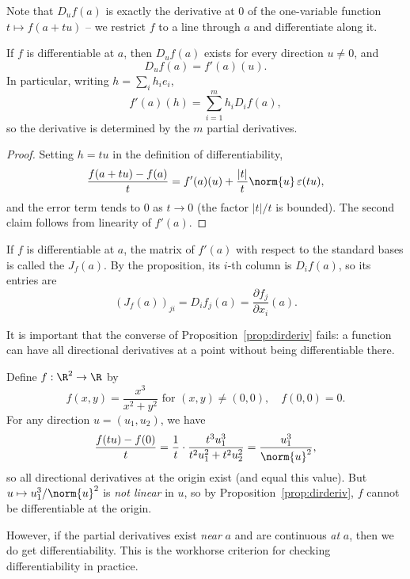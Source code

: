 Note that $D_u f(a)$ is exactly the derivative at $0$ of the one-variable function $t \mapsto f(a + tu)$ -- we restrict $f$ to a line through $a$ and differentiate along it.

\begin{proposition}\label{prop:dirderiv}
    If $f$ is differentiable at $a$, then $D_u f(a)$ exists for every direction $u \neq 0$, and
    $$
    D_u f(a) = f'(a)(u).
    $$
    In particular, writing $h = \sum_i h_i e_i$,
    $$
    f'(a)(h) = \sum_{i = 1}^m h_i D_i f(a),
    $$
    so the derivative is determined by the $m$ partial derivatives.
\end{proposition}
\begin{proof}
    Setting $h = tu$ in the definition of differentiability,
    $$
    \frac{f(a + tu) - f(a)}{t} = f'(a)(u) + \frac{|t|}{t}\norm{u} \, \varepsilon(tu),
    $$
    and the error term tends to $0$ as $t \rightarrow 0$ (the factor $|t|/t$ is bounded). The second claim follows from linearity of $f'(a)$.
\end{proof}

\begin{definition}
    If $f$ is differentiable at $a$, the matrix of $f'(a)$ with respect to the standard bases is called the  $J_f(a)$. By the proposition, its $i$-th column is $D_i f(a)$, so its entries are
    $$
    (J_f(a))_{ji} = D_i f_j(a) = \frac{\partial f_j}{\partial x_i}(a).
    $$
\end{definition}

It is important that the converse of Proposition~\ref{prop:dirderiv} fails: a function can have all directional derivatives at a point without being differentiable there.

\begin{example}
    Define $f: \R^2 \rightarrow \R$ by
    $$
    f(x, y) = \frac{x^3}{x^2 + y^2} \text{ for } (x, y) \neq (0,0), \quad f(0, 0) = 0.
    $$
    For any direction $u = (u_1, u_2)$, we have
    $$
    \frac{f(tu) - f(0)}{t} = \frac{1}{t}\cdot\frac{t^3u_1^3}{t^2 u_1^2 + t^2u_2^2} = \frac{u_1^3}{\norm{u}^2},
    $$
    so all directional derivatives at the origin exist (and equal this value). But $u \mapsto u_1^3/\norm{u}^2$ is \emph{not linear} in $u$, so by Proposition~\ref{prop:dirderiv}, $f$ cannot be differentiable at the origin.
\end{example}

However, if the partial derivatives exist \emph{near} $a$ and are continuous \emph{at} $a$, then we do get differentiability. This is the workhorse criterion for checking differentiability in practice.

